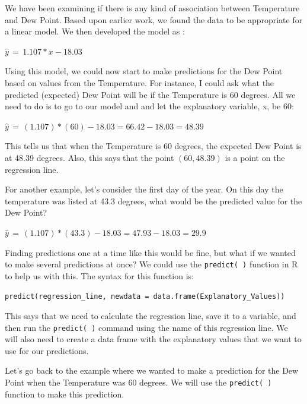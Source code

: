 \documentclass[
  letterpaper,
  DIV=11,
  numbers=noendperiod]{scrreprt}
\begin{document}
We have been examining if there is any kind of association between
Temperature and Dew Point. Based upon earlier work, we found the data to
be appropriate for a linear model. We then developed the model as :

\(\hat{y} \, = \, 1.107*x - 18.03\)

Using this model, we could now start to make predictions for the Dew
Point based on values from the Temperature. For instance, I could ask
what the predicted (expected) Dew Point will be if the Temperature is 60
degrees. All we need to do is to go to our model and and let the
explanatory variable, x, be 60:

\(\hat{y} \, = \, (1.107)*(60) - 18.03 = 66.42 - 18.03 = 48.39\)

This tells us that when the Temperature is 60 degrees, the expected Dew
Point is at 48.39 degrees. Also, this says that the point
\((60, 48.39)\) is a point on the regression line.

For another example, let's consider the first day of the year. On this
day the temperature was listed at 43.3 degrees, what would be the
predicted value for the Dew Point?

\(\hat{y} \, = \, (1.107)*(43.3) - 18.03 = 47.93 - 18.03 = 29.9\)

Finding predictions one at a time like this would be fine, but what if
we wanted to make several predictions at once? We could use the
\texttt{predict(\ )} function in R to help us with this. The syntax for
this function is:

\texttt{predict(regression\_line,\ newdata\ =\ data.frame(Explanatory\_Values))}

This says that we need to calculate the regression line, save it to a
variable, and then run the \texttt{predict(\ )} command using the name
of this regression line. We will also need to create a data frame with
the explanatory values that we want to use for our predictions.

Let's go back to the example where we wanted to make a prediction for
the Dew Point when the Temperature was 60 degrees. We will use the
\texttt{predict(\ )} function to make this prediction.
\end{document}
